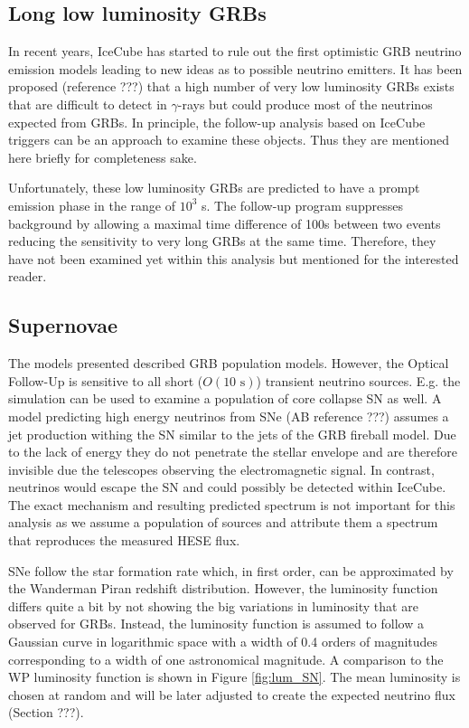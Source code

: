 

\subsection{Long low luminosity GRBs}
In recent years, IceCube has started to rule out the first optimistic GRB
neutrino emission models leading to new ideas as to possible neutrino emitters.
It has been proposed (reference ???) that a high number of very low
luminosity GRBs exists that are difficult to detect in $\gamma$-rays but could
produce most of the neutrinos expected from GRBs. In principle, the follow-up
analysis based on IceCube triggers can be an approach to examine these objects.
Thus they are mentioned here briefly for completeness sake. 

Unfortunately, these low luminosity GRBs are predicted to have a prompt
emission phase in the range of $10^3$ s. The follow-up program suppresses
background by allowing a maximal time difference of 100s between two events
reducing the sensitivity to very long GRBs at the same time. Therefore, they
have not been examined yet within this analysis but mentioned for the 
interested reader.

\subsection{Supernovae}
The models presented described GRB population models. However, the Optical 
Follow-Up is sensitive to all short ($O(10 \text{ s})$) transient neutrino 
sources. E.g. the simulation can be used to examine a population of core 
collapse SN as well. A model predicting high energy neutrinos from SNe (AB 
reference ???) assumes a jet production withing the SN similar to the jets of 
the GRB fireball model. Due to the lack of energy they do not penetrate the 
stellar envelope and are therefore invisible due the telescopes 
observing the electromagnetic signal. In contrast, neutrinos would escape the 
SN and could possibly be detected within IceCube. The exact mechanism and 
resulting predicted spectrum is not important for this analysis as we assume a 
population of sources and attribute them a spectrum that reproduces the 
measured HESE flux.

SNe follow the star formation rate which, in first order, can be approximated 
by the Wanderman Piran redshift distribution. However, the luminosity function 
differs quite a bit by not showing the big variations in luminosity that are 
observed for GRBs. Instead, the luminosity function is assumed to follow a 
Gaussian curve in logarithmic space with a width of 0.4 orders of magnitudes 
corresponding to a width of one astronomical magnitude. A comparison to the WP 
luminosity function is shown in Figure \ref{fig:lum_SN}. The mean luminosity is 
chosen at random and will be later adjusted to create the expected neutrino 
flux (Section ???).



